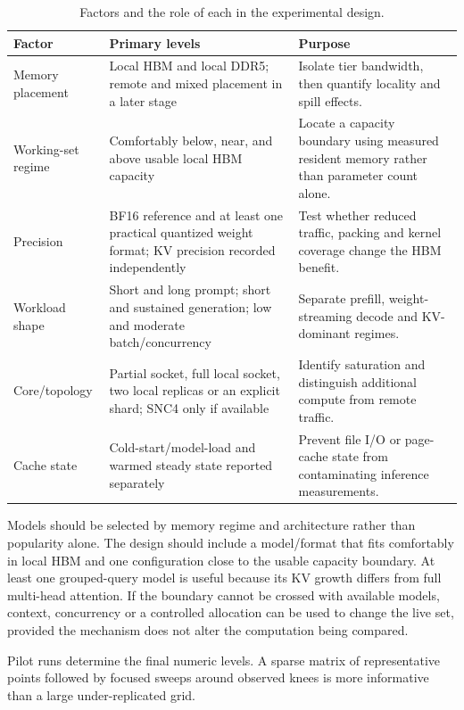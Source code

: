 \begin{table}[htbp]
\centering
\small
\tabsetup
\caption{Factors and the role of each in the experimental design.}
\label{tab:experimental-factors}
\begin{tabularx}{\textwidth}{@{}lYY@{}}
\toprule
\headrow
\textbf{Factor} & \textbf{Primary levels} & \textbf{Purpose} \\
\midrule
Memory placement
 & Local HBM and local DDR5; remote and mixed placement in a later stage
 & Isolate tier bandwidth, then quantify locality and spill effects. \\
Working-set regime
 & Comfortably below, near, and above usable local HBM capacity
 & Locate a capacity boundary using measured resident memory rather than
   parameter count alone. \\
Precision
 & BF16 reference and at least one practical quantized weight format;
   KV precision recorded independently
 & Test whether reduced traffic, packing and kernel coverage change the
   HBM benefit. \\
Workload shape
 & Short and long prompt; short and sustained generation; low and
   moderate batch/concurrency
 & Separate prefill, weight-streaming decode and KV-dominant regimes. \\
Core/topology
 & Partial socket, full local socket, two local replicas or an explicit
   shard; SNC4 only if available
 & Identify saturation and distinguish additional compute from remote
   traffic. \\
Cache state
 & Cold-start/model-load and warmed steady state reported separately
 & Prevent file I/O or page-cache state from contaminating inference
   measurements. \\
\bottomrule
\end{tabularx}
\end{table}

Models should be selected by memory regime and architecture rather than
popularity alone.  The design should include a model/format that fits
comfortably in local HBM and one configuration close to the usable
capacity boundary.  At least one grouped-query model is useful because
its KV growth differs from full multi-head attention.  If the boundary
cannot be crossed with available models, context, concurrency or a
controlled allocation can be used to change the live set, provided the
mechanism does not alter the computation being compared.

Pilot runs determine the final numeric levels.  A sparse matrix of
representative points followed by focused sweeps around observed knees
is more informative than a large under-replicated grid.

